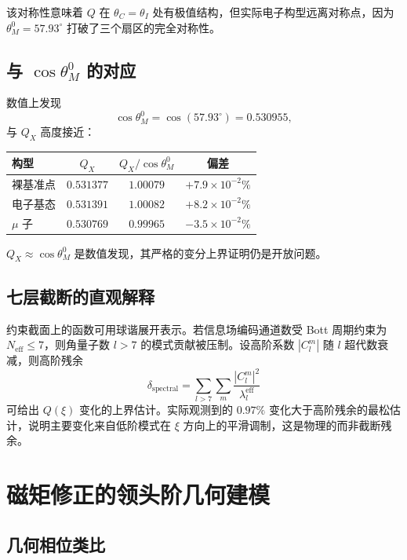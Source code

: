 \documentclass[12pt,a4paper]{article}
\theoremstyle{definition}
\begin{document}
该对称性意味着 $Q$ 在 $\theta_C=\theta_I$ 处有极值结构，但实际电子构型远离对称点，因为 $\theta_M^0=57.93^\circ$ 打破了三个扇区的完全对称性。

\subsection{与 $\cos\theta_M^0$ 的对应}

数值上发现
\begin{equation}
\cos\theta_M^0=\cos(57.93^\circ)=0.530955,
\end{equation}
与 $Q_X$ 高度接近：

\begin{center}
\begin{tabular}{@{}lccc@{}}
\toprule
构型 & $Q_X$ & $Q_X/\cos\theta_M^0$ & 偏差 \\
\midrule
裸基准点 & $0.531377$ & $1.00079$ & $+7.9\times10^{-2}\%$ \\
电子基态 & $0.531391$ & $1.00082$ & $+8.2\times10^{-2}\%$ \\
$\mu$ 子 & $0.530769$ & $0.99965$ & $-3.5\times10^{-2}\%$ \\
\bottomrule
\end{tabular}
\end{center}

$Q_X\approx\cos\theta_M^0$ 是数值发现，其严格的变分上界证明仍是开放问题。

\subsection{七层截断的直观解释}

约束截面上的函数可用球谐展开表示。若信息场编码通道数受 Bott 周期约束为 $N_{\text{eff}}\le 7$，则角量子数 $l>7$ 的模式贡献被压制。设高阶系数 $|C_l^m|$ 随 $l$ 超代数衰减，则高阶残余
\begin{equation}
\delta_{\text{spectral}}=\sum_{l>7}\sum_m\frac{|C_l^m|^2}{\lambda_l^{\text{eff}}}
\end{equation}
可给出 $Q(\xi)$ 变化的上界估计。实际观测到的 $0.97\%$ 变化大于高阶残余的最松估计，说明主要变化来自低阶模式在 $\xi$ 方向上的平滑调制，这是物理的而非截断残余。

\section{磁矩修正的领头阶几何建模}

\subsection{几何相位类比}
\end{document}
